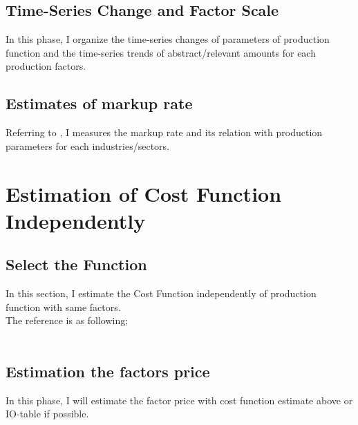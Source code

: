 \documentclass[aspectratio=169, dvipdfmx, 11pt]{beamer}
\begin{document}
\subsection{Time-Series Change and Factor Scale}
\begin{frame}
    In this phase, I organize the time-series changes of parameters of production function and the time-series trends of abstract/relevant amounts for each production factors.
\end{frame}

\subsection{Estimates of markup rate}
\begin{frame}
    Referring to \hyperlink{https://repository.tku.ac.jp/dspace/bitstream/11150/11249/1/keizai299-11.pdf}{}, I measures the markup rate and its relation with production parameters for each industries/sectors.
\end{frame}

\section[Cost Function]{Estimation of Cost Function Independently}
\subsection{Select the Function}
\begin{frame}
    In this section, I estimate the Cost Function independently of production function with same factors.\\
    The reference is as following;\\
    \vspace{10mm}
    \hyperlink{https://doshisha.repo.nii.ac.jp/?action=repository_action_common_download&item_id=22965&item_no=1&attribute_id=28&file_no=1}{}\\
    \vspace{6mm}
    \hyperlink{https://core.ac.uk/download/pdf/71796667.pdf}{}
\end{frame}

\subsection{Estimation the factors price}
\begin{frame}
    In this phase, I will estimate the factor price with cost function estimate above or IO-table if possible.
\end{frame}
\end{document}
